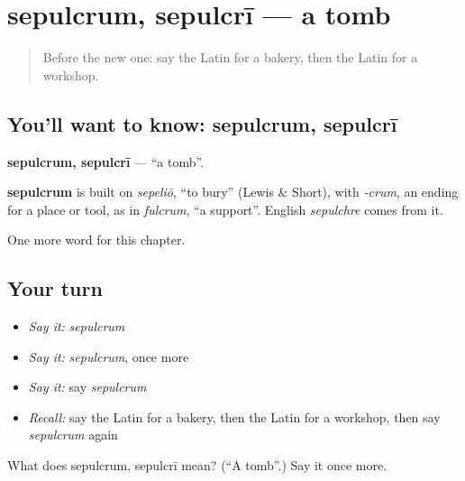 \section[sepulcrum, sepulcrī]{sepulcrum, sepulcrī — a tomb}

\label{lesson:LA-C118-sepulcrum}



\begin{quote}
Before the new one: say the Latin for a bakery, then the Latin for a workshop.
\end{quote}

\subsection*{You'll want to know: sepulcrum, sepulcrī}
\textbf{sepulcrum, sepulcrī} — \textquotedblleft{}a tomb\textquotedblright{}.

\begin{cousinweb}
\textbf{sepulcrum} is built on \emph{sepeliō}, \textquotedblleft{}to bury\textquotedblright{} (Lewis \& Short), with \emph{-crum}, an ending for a place or tool, as in \emph{fulcrum}, \textquotedblleft{}a support\textquotedblright{}. English \emph{sepulchre} comes from it.
\end{cousinweb}

\begin{grammarlens}[title={What you've built}]
One more word for this chapter.
\end{grammarlens}

\subsection*{Your turn}
\begin{itemize}
\raggedright
  \item \emph{Say it:} \emph{sepulcrum}
  \item \emph{Say it:} \emph{sepulcrum}, once more
  \item \emph{Say it:} say \emph{sepulcrum}
  \item \emph{Recall:} say the Latin for a bakery, then the Latin for a workshop, then say \emph{sepulcrum} again
\end{itemize}

\begin{tcolorbox}[breakable,colback=teal!4,colframe=teal!35!black,title={Before you move on}]
What does sepulcrum, sepulcrī mean? (\textquotedblleft{}A tomb\textquotedblright{}.) Say it once more.
\end{tcolorbox}
